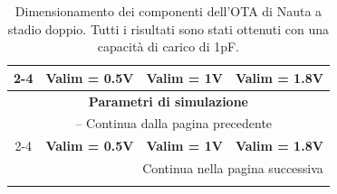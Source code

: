 \begin{longtable}{c|c|c|c|}
    \caption{Dimensionamento dei componenti dell'OTA di Nauta a stadio doppio. Tutti i risultati sono stati ottenuti con una capacità di carico di 1pF.}
    \label{tab:component_sizing_nauta_double_stage} \\
    
    \cline{2-4}
    & \textbf{Valim = 0.5V} & \textbf{Valim = 1V} & \textbf{Valim = 1.8V} \\ \hline
    \multicolumn{4}{|c|}{\textbf{Parametri di simulazione}} \\ \hline
    \endfirsthead
    
    \multicolumn{4}{c}{\tablename\ \thetable{} -- Continua dalla pagina precedente} \\
    \cline{2-4}
    & \textbf{Valim = 0.5V} & \textbf{Valim = 1V} & \textbf{Valim = 1.8V} \\ \hline
    \endhead
    
    \multicolumn{4}{r}{{Continua nella pagina successiva}} \\
    \endfoot
    
    \endlastfoot


\end{longtable}
